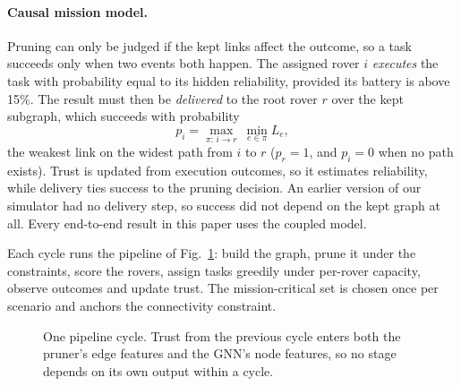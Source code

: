 \documentclass[11pt]{article}
\begin{document}
\paragraph{Causal mission model.}
Pruning can only be judged if the kept links affect the outcome, so a task
succeeds only when two events both happen. The assigned rover $i$
\emph{executes} the task with probability equal to its hidden reliability,
provided its battery is above 15\%. The result must then be \emph{delivered}
to the root rover $r$ over the kept subgraph, which succeeds with probability
\begin{equation}
p_i=\max_{\pi:\,i\to r}\ \min_{e\in\pi}L_e,
\label{eq:delivery}
\end{equation}
the weakest link on the widest path from $i$ to $r$ ($p_r=1$, and $p_i=0$ when
no path exists). Trust is updated from execution outcomes, so it estimates
reliability, while delivery ties success to the pruning decision. An earlier
version of our simulator had no delivery step, so success did not depend on
the kept graph at all. Every end-to-end result in this paper uses the coupled
model.

Each cycle runs the pipeline of Fig.~\ref{fig:pipeline}: build the graph,
prune it under the constraints, score the rovers, assign tasks greedily under
per-rover capacity, observe outcomes and update trust. The mission-critical
set is chosen once per scenario and anchors the connectivity constraint.

\begin{figure}[t]
\centering
{}
\caption{One pipeline cycle. Trust from the previous cycle enters both the
pruner's edge features and the GNN's node features, so no stage depends on
its own output within a cycle.}
\label{fig:pipeline}
\end{figure}
\end{document}

